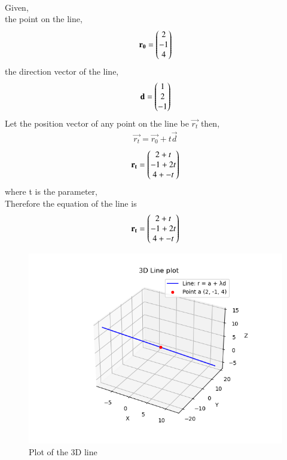 \documentclass[journal]{IEEEtran}
\begin{document}
         \solution \\
         Given,\\
         the point on the line,
         \begin{align}
             \mathbf{r_0}=\begin{pmatrix}2\\-1\\4\end{pmatrix}
         \end{align}
         the direction vector of the line,
         \begin{align}
             \mathbf{d}=\begin{pmatrix}1\\2\\-1\end{pmatrix}
         \end{align}
         Let the position vector of any point on the line be $\vec{r_t}$ then,
         \begin{align}
             \vec{r_t}=\vec{r_0}+t\vec{d}
         \end{align}
         \begin{align}
             \mathbf{r_t}=\begin{pmatrix}2+t\\-1+2t\\4+-t\end{pmatrix}
         \end{align}
         where t is the parameter,\\
         Therefore the equation of the line is 
         \begin{align}
             \mathbf{r_t}=\begin{pmatrix}2+t\\-1+2t\\4+-t\end{pmatrix}
         \end{align}
         \begin{figure}
             \centering
             \includegraphics[width=1\columnwidth]{figs/fig12.png}
             \caption{Plot of the 3D line}
             \label{fig1}
         \end{figure}
         
\end{document}
